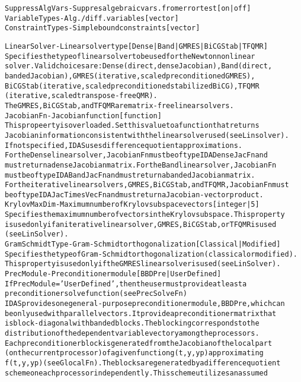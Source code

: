 \begin{alltt}
SuppressAlgVars - Suppres algebraic vars. from error test [ on | {off} ]
VariableTypes - Alg./diff. variables [ vector ]
ConstraintTypes - Simple bound constraints [ vector ]

LinearSolver - Linear solver type [{Dense}|Band|GMRES|BiCGStab|TFQMR]
   Specifies the type of linear solver to be used for the Newton nonlinear
   solver. Valid choices are: Dense (direct, dense Jacobian), Band (direct,
   banded Jacobian), GMRES (iterative, scaled preconditioned GMRES),
   BiCGStab (iterative, scaled preconditioned stabilized BiCG), TFQMR
   (iterative, scaled transpose-free QMR).
   The GMRES, BiCGStab, and TFQMR are matrix-free linear solvers.
JacobianFn - Jacobian function [ function ]
   This propeerty is overloaded. Set this value to a function that returns
   Jacobian information consistent with the linear solver used (see Linsolver).
   If not specified, IDAS uses difference quotient approximations.
   For the Dense linear solver, JacobianFn must be of type IDADenseJacFn and
   must return a dense Jacobian matrix. For the Band linear solver, JacobianFn
   must be of type IDABandJacFn and must return a banded Jacobian matrix.
   For the iterative linear solvers, GMRES, BiCGStab, and TFQMR, JacobianFn must
   be of type IDAJacTimesVecFn and must return a Jacobian-vector product.
KrylovMaxDim - Maximum number of Krylov subspace vectors [ integer | {5} ]
   Specifies the maximum number of vectors in the Krylov subspace. This property
   is used only if an iterative linear solver, GMRES, BiCGStab, or TFQMR is used
   (see LinSolver).
GramSchmidtType - Gram-Schmidt orthogonalization [ Classical | {Modified} ]
   Specifies the type of Gram-Schmidt orthogonalization (classical or modified).
   This property is used only if the GMRES linear solver is used (see LinSolver).
PrecModule - Preconditioner module [ BBDPre | {UserDefined} ]
   If PrecModule = 'UserDefined', then the user must provide at least a
   preconditioner solve function (see PrecSolveFn)
   IDAS provides one general-purpose preconditioner module, BBDPre, which can
   be only used with parallel vectors. It provide a preconditioner matrix that
   is block-diagonal with banded blocks. The blocking corresponds to the
   distribution of the dependent variable vector y among the processors.
   Each preconditioner block is generated from the Jacobian of the local part
   (on the current processor) of a given function g(t,y,yp) approximating
   f(t,y,yp) (see GlocalFn). The blocks are generated by a difference quotient
   scheme on each processor independently. This scheme utilizes an assumed

\end{alltt}
